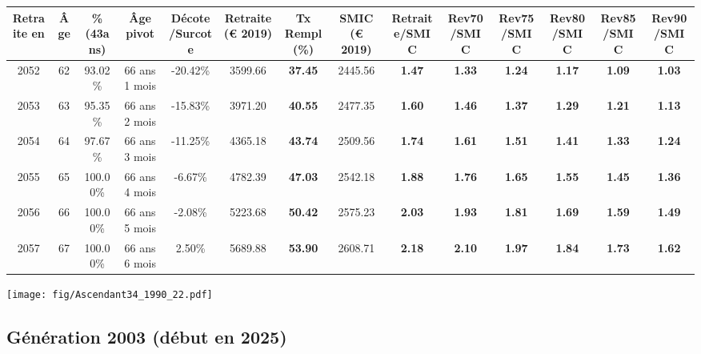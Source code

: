 \begin{adjustbox}{max width=\textwidth} 
\begin{tabular}[htb]{|c|c||c|c|c||c|c||c||c|c|c|c|c|c|} 
\hline 
 Retraite en &  Âge &  \%(43ans) &  Âge pivot &  Décote/Surcote &  Retraite (\euro{} 2019) &  Tx Rempl(\%) &  SMIC (\euro{} 2019) &  Retraite/SMIC &  Rev70/SMIC &  Rev75/SMIC &  Rev80/SMIC &  Rev85/SMIC &  Rev90/SMIC \\ 
\hline \hline 
 2052 &  62 &  93.02\% &  66 ans 1 mois &  -20.42\% &  3599.66 &  {\bf 37.45} &  2445.56 &  {\bf 1.47} &  {\bf 1.33} &  {\bf 1.24} &  {\bf 1.17} &  {\bf 1.09} &  {\bf 1.03} \\ 
\hline 
 2053 &  63 &  95.35\% &  66 ans 2 mois &  -15.83\% &  3971.20 &  {\bf 40.55} &  2477.35 &  {\bf 1.60} &  {\bf 1.46} &  {\bf 1.37} &  {\bf 1.29} &  {\bf 1.21} &  {\bf 1.13} \\ 
\hline 
 2054 &  64 &  97.67\% &  66 ans 3 mois &  -11.25\% &  4365.18 &  {\bf 43.74} &  2509.56 &  {\bf 1.74} &  {\bf 1.61} &  {\bf 1.51} &  {\bf 1.41} &  {\bf 1.33} &  {\bf 1.24} \\ 
\hline 
 2055 &  65 &  100.00\% &  66 ans 4 mois &  -6.67\% &  4782.39 &  {\bf 47.03} &  2542.18 &  {\bf 1.88} &  {\bf 1.76} &  {\bf 1.65} &  {\bf 1.55} &  {\bf 1.45} &  {\bf 1.36} \\ 
\hline 
 2056 &  66 &  100.00\% &  66 ans 5 mois &  -2.08\% &  5223.68 &  {\bf 50.42} &  2575.23 &  {\bf 2.03} &  {\bf 1.93} &  {\bf 1.81} &  {\bf 1.69} &  {\bf 1.59} &  {\bf 1.49} \\ 
\hline 
 2057 &  67 &  100.00\% &  66 ans 6 mois &  2.50\% &  5689.88 &  {\bf 53.90} &  2608.71 &  {\bf 2.18} &  {\bf 2.10} &  {\bf 1.97} &  {\bf 1.84} &  {\bf 1.73} &  {\bf 1.62} \\ 
\hline 
\hline 
\end{tabular} 
\end{adjustbox} 
 
 \vspace{0.1cm} 

 \begin{center}\texttt{[image: fig/Ascendant34\_1990\_22.pdf]}\end{center} \label{fig/Ascendant34_1990_22.pdf} 

\newpage 
 
\subsection{Génération 2003 (début en 2025)} 

